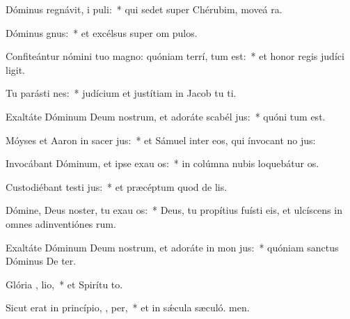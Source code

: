 \item Dóminus regnávit, i puli:~* qui sedet super Chérubim, moveá ra.
\item Dóminus   gnus:~* et excélsus super om pulos.
\item Confiteántur nómini tuo magno: quóniam terrí,  tum est:~* et honor regis judíci ligit.
\item Tu parásti nes:~* judícium et justítiam in Jacob tu ti.
\item Exaltáte Dóminum Deum nostrum, et adoráte scabél  jus:~* quóni tum est.
\item Móyses et Aaron in sacer jus:~* et Sámuel inter eos, qui ínvocant no jus:
\item Invocábant Dóminum, et ipse exau os:~* in colúmna nubis loquebátur  os.
\item Custodiébant testi jus:~* et præcéptum quod de lis.
\item Dómine, Deus noster, tu exau os:~* Deus, tu propítius fuísti eis, et ulcíscens in omnes adinventiónes rum.
\item Exaltáte Dóminum Deum nostrum, et adoráte in mon  jus:~* quóniam sanctus Dóminus De ter.
\item Glória ,  lio,~* et Spirítu to.
\item Sicut erat in princípio,  ,  per,~* et in sǽcula sæculó. men.
